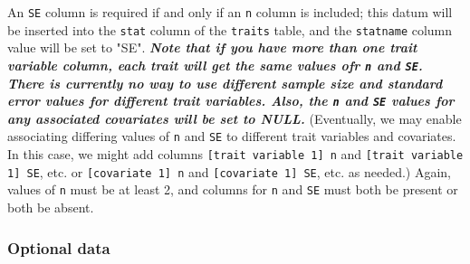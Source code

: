\begin{enumerate}
An \verb|SE| column is required if and only if an \verb|n| column is included;
    this datum will be inserted into the \verb|stat| column of the \verb|traits| table,
    and the \verb|statname| column value will be set to "SE".  \textit\textbf{Note that if you have more than one trait variable column, each trait will get the same values ofr \verb|n| and \verb|SE|.  There is currently no way to use different sample size and standard error values for different trait variables.  Also, the \verb|n| and \verb|SE| values for any associated covariates will be set to NULL.}  (Eventually, we may enable associating differing values of \verb|n| and \verb|SE| to different trait variables and covariates.  In this case, we might add columns
 \verb|[trait variable 1] n| and \verb|[trait variable 1] SE|, etc. or
 \verb|[covariate 1] n| and \verb|[covariate 1] SE|, etc. as needed.)  Again,
 values of \verb|n| must be at least 2, and columns for \verb|n| and \verb|SE|
 must both be present or both be absent.

  \end{enumerate}

\subsubsection{Optional data}

